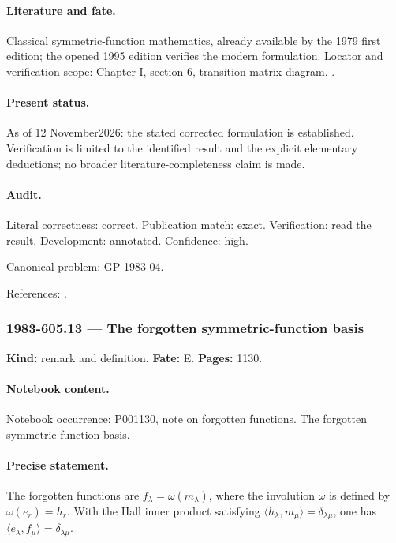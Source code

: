 \paragraph{Literature and fate.} Classical symmetric-function mathematics, already available by the 1979 first edition; the opened 1995 edition verifies the modern formulation. Locator and verification scope: Chapter I, section 6, transition-matrix diagram. \cite{macdonald1995symmetric}.

\paragraph{Present status.} As of 12 November2026: the stated corrected formulation is established. Verification is limited to the identified result and the explicit elementary deductions; no broader literature-completeness claim is made.

\paragraph{Audit.} Literal correctness: correct. Publication match: exact. Verification: read the result. Development: annotated. Confidence: high.

\noindent Canonical problem: GP-1983-04.\par

\noindent References: \citep{macdonald1995symmetric}.\par

\subsubsection{1983-605.13 --- The forgotten symmetric-function basis}

\label{item:1983-605.13}

\noindent\textbf{Kind:} remark and definition. \textbf{Fate:} E. \textbf{Pages:} 1130.\par

\paragraph{Notebook content.} Notebook occurrence: P001130, note on forgotten functions. The forgotten symmetric-function basis.

\paragraph{Precise statement.} The forgotten functions are \(f_\lambda=\omega(m_\lambda)\), where the involution \(\omega\) is defined by \(\omega(e_r)=h_r\). With the Hall inner product satisfying \(\langle h_\lambda,m_\mu\rangle=\delta_{\lambda\mu}\), one has \(\langle e_\lambda,f_\mu\rangle=\delta_{\lambda\mu}\).

